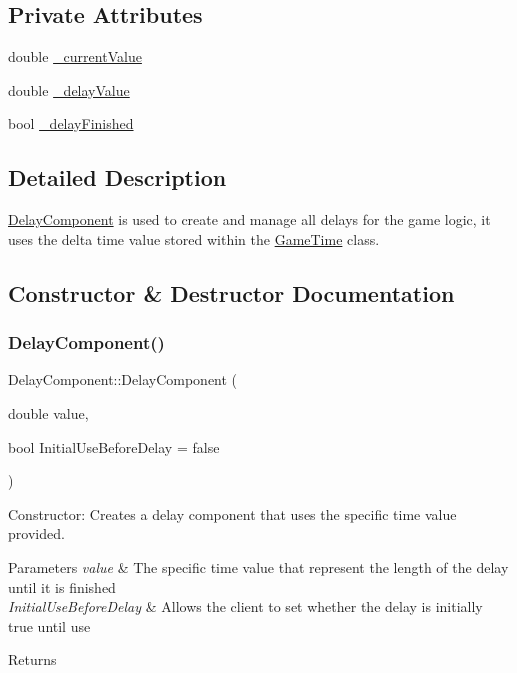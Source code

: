 \subsection*{Private Attributes}
\begin{DoxyCompactItemize}
\item 
double \hyperlink{class_delay_component_a33d6e279ece1ab6197688c5916dad96d}{\+\_\+current\+Value}
\item 
double \hyperlink{class_delay_component_a36f26c01438d1c0347d06888d3b841ac}{\+\_\+delay\+Value}
\item 
bool \hyperlink{class_delay_component_a821cd453973fced990ae204967e011ff}{\+\_\+delay\+Finished}
\end{DoxyCompactItemize}


\subsection{Detailed Description}
\hyperlink{class_delay_component}{Delay\+Component} is used to create and manage all delays for the game logic, it uses the delta time value stored within the \hyperlink{class_game_time}{Game\+Time} class. 

\subsection{Constructor \& Destructor Documentation}
\mbox{\label{class_delay_component_a14ff75c76f9e0292f52aadd9e58bec81}} 
\subsubsection{\texorpdfstring{Delay\+Component()}{DelayComponent()}}
{\footnotesize\ttfamily Delay\+Component\+::\+Delay\+Component (\begin{DoxyParamCaption}\item[{double}]{value,  }\item[{bool}]{Initial\+Use\+Before\+Delay = {\ttfamily false} }\end{DoxyParamCaption})}



Constructor\+: Creates a delay component that uses the specific time value provided. 


\begin{DoxyParams}{Parameters}
{\em value} & The specific time value that represent the length of the delay until it is finished \\
\hline
{\em Initial\+Use\+Before\+Delay} & Allows the client to set whether the delay is initially true until use \\
\hline
\end{DoxyParams}
\begin{DoxyReturn}{Returns}

\end{DoxyReturn}


